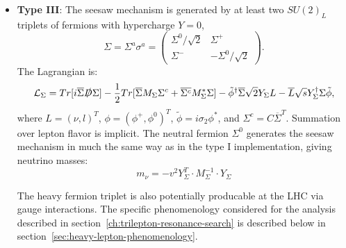 \begin{itemize}
	\item \textbf{Type III}: The seesaw mechanism is generated by at least two $SU(2)_L$ triplets of fermions with hypercharge $Y=0$,
	\begin{equation}
		\Sigma = \Sigma^a \sigma^a = \left(\begin{array}{cc} \Sigma^0/\sqrt{2} & \Sigma^+ \\ \Sigma^- & -\Sigma^0/\sqrt{2} \end{array}\right). 
	\end{equation}
	The Lagrangian is:
	\begin{equation}
		\mathcal{L}_{\Sigma} = Tr[i\overline{\Sigma}\slashed{D}\Sigma] - \frac12 Tr[\overline{\Sigma}M_{\Sigma}\Sigma^c+\overline{\Sigma^c}M_{\Sigma}^{*}\Sigma] - \tilde{\phi}^{\dagger}\overline{\Sigma}\sqrt{2}Y_{\Sigma}L - \overline{L}\sqrt{s}Y_{\Sigma}^{\dagger}\Sigma \tilde{\phi},
	\end{equation}
	where $L=(\nu,l)^T$, $\phi=(\phi^+, \phi^0)^T$, $\tilde{\phi}=i\sigma_2\phi^{*}$, and $\Sigma^c=C\overline{\Sigma}^T$. Summation over lepton flavor is implicit. The neutral fermion $\Sigma^0$ generates the seesaw mechanism in much the same way as in the type I implementation, giving neutrino masses:
	\begin{equation}
		m_{\nu} = -v^2 Y_{\Sigma}^T \cdot M_{\Sigma}^{-1} \cdot Y_{\Sigma}
	\end{equation}
	
	The heavy fermion triplet is also potentially producable at the LHC via gauge interactions. The specific phenomenology considered for the analysis described in section~\ref{ch:trilepton-resonance-search} is described below in section~\ref{sec:heavy-lepton-phenomenology}. 
\end{itemize}






\printbibliography